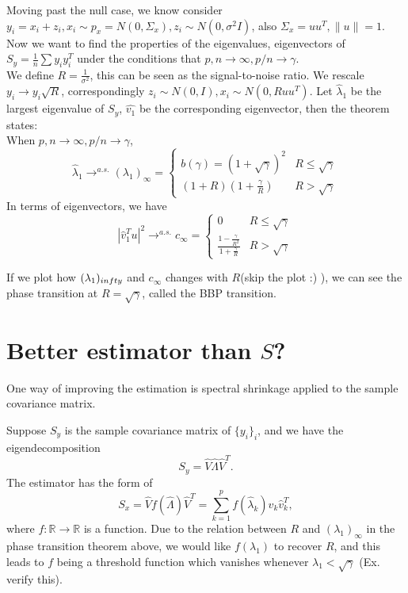 \documentclass[12pt]{article}
\theoremstyle{plain}
\begin{document}
Moving past the null case, we know consider $y_i = x_i + z_i, x_i \sim p_x=N(0, \Sigma_x), z_i \sim N(0,\sigma^2 I)$, also $\Sigma_x = uu^T, \|u\|=1$. Now we want to find the properties of the eigenvalues, eigenvectors of $S_y = \frac{1}{n}\sum y_i y_i^T$ under the conditions that $p,n \rightarrow \infty, p/n \rightarrow \gamma$. \\
We define $R = \frac{1}{\sigma^2}$, this can be seen as the signal-to-noise ratio. We rescale $y_i \rightarrow y_i\sqrt{R}$, correspondingly $z_i \sim N(0,I), x_i \sim N(0, R uu^T)$. Let $\hat{\lambda}_1$ be the largest eigenvalue of $S_y$, $\hat{v_1}$ be the corresponding eigenvector, then the theorem states:\\
When  $p,n \rightarrow \infty, p/n \rightarrow \gamma$, 
$$\hat{\lambda}_1 \rightarrow^{a.s.} (\lambda_1)_{\infty} = 
\begin{cases}
  b(\gamma) = (1+\sqrt{\gamma})^2 & R \leq \sqrt{\gamma}\\
  (1+R)(1+\frac{\gamma}{R}) & R>\sqrt{\gamma}
\end{cases}$$
In terms of eigenvectors, we have 
$$|\hat{v}_1^Tu|^2 \rightarrow^{a.s.} c_{\infty} = 
\begin{cases}
  0 & R \leq \sqrt{\gamma}\\
  \frac{1-\frac{\gamma}{R^2}}{1+\frac{\gamma}{R}}  & R>\sqrt{\gamma}
\end{cases}$$

If we plot how $ (\lambda_1)_{\\infty}$ and $c_{\infty}$ changes with $R$(skip the plot :) ), we can see the phase transition at $R=\sqrt{\gamma}$, called the  BBP transition.

\section*{Better estimator than $S$?}

One way of improving the estimation is spectral shrinkage applied to the sample covariance matrix.

Suppose $S_y$ is the sample covariance matrix of $\{y_i\}_i$, and we have the eigendecomposition 
$$S_y = \hat{V} \hat{\Lambda}\hat{V}^T.$$
The estimator has the form of  
 $$S_x =  \hat{V} f(\hat{\Lambda})\hat{V}^T = \sum_{k=1}^p f(\hat{\lambda}_k)\hat{v}_k \hat{v}_k^T ,$$
 where $f: \mathbb{R} \to \mathbb{R}$ is a function. 
Due to the relation between $R$ and $(\lambda_1)_\infty$ in the phase transition theorem above, we would like $f(\lambda_1)$ to recover $R$, and this leads to $f$ being a threshold function which vanishes whenever $\lambda_1 < \sqrt{\gamma}$ (Ex. verify this).
 
\end{document}
